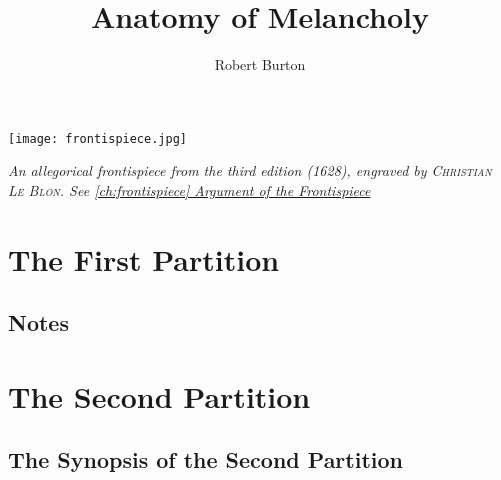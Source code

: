 \documentclass[titlepage,12pt,superroyal]{octavo}
\title{Anatomy of Melancholy}
\author{Robert Burton}
\begin{document}
\frontmatter
{}
\begin{titlepage}
   \label{cover}
\end{titlepage}
  {\begin{center}
    \texttt{[image: frontispiece.jpg]}\label{Frontispiece}

    {\linespread{0.5}\scriptsize{}\textit{An allegorical frontispiece from the third edition (1628), engraved by \textsc{Christian Le Blon}.
    See \hyperref[ch:frontispiece]{\autoref*{ch:frontispiece} Argument of the Frontispiece}}}
  \end{center}
  }
  \restoregeometry
  {
    
  }
\restoregeometry
\tableofcontents
\clearpage
{}
{}
\listoffigures
\clearpage
{}
{}

\clearpage
\mainmatter






\part{The First Partition}







\chapter{Notes}
\part{The Second Partition}
\chapter{The Synopsis of the Second Partition}





\end{document}
